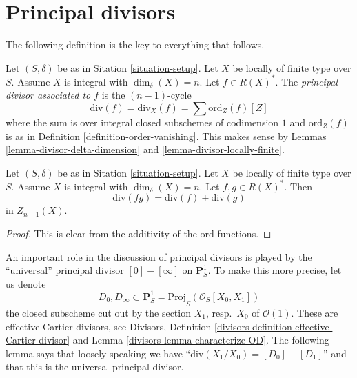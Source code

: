 \section{Principal divisors}
\label{section-principal-divisors}

\noindent
The following definition is the key to everything that follows.

\begin{definition}
\label{definition-principal-divisor}
Let $(S, \delta)$ be as in Sitation \ref{situation-setup}.
Let $X$ be locally of finite type over $S$. Assume $X$ is
integral with $\dim_\delta(X) = n$.
Let $f \in R(X)^*$. The {\it principal divisor
associated to $f$} is the $(n - 1)$-cycle
$$
\text{div}(f) = \text{div}_X(f) = \sum \text{ord}_Z(f) [Z]
$$
where the sum is over integral closed subschemes of
codimension $1$ and $\text{ord}_Z(f)$ is as in
Definition \ref{definition-order-vanishing}. This makes sense
by Lemmas \ref{lemma-divisor-delta-dimension} and
\ref{lemma-divisor-locally-finite}.
\end{definition}


\begin{lemma}
\label{lemma-div-additive}
Let $(S, \delta)$ be as in Sitation \ref{situation-setup}.
Let $X$ be locally of finite type over $S$. Assume $X$ is
integral with $\dim_\delta(X) = n$.
Let $f, g \in R(X)^*$.
Then
$$
\text{div}(fg) = \text{div}(f) + \text{div}(g)
$$
in $Z_{n - 1}(X)$.
\end{lemma}

\begin{proof}
This is clear from the additivity of the $\text{ord}$ functions.
\end{proof}

\noindent
An important role in the discussion of principal divisors
is played by the ``universal'' principal divisor $[0] - [\infty]$
on $\mathbf{P}^1_S$. To make this more precise, let us denote
$$
D_0, D_\infty \subset
\mathbf{P}^1_S = \underline{\text{Proj}}_S(\mathcal{O}_S[X_0, X_1])
$$
the closed subscheme cut out by the section $X_1$, resp.\ $X_0$
of $\mathcal{O}(1)$. These are effective Cartier divisors, see
Divisors, Definition \ref{divisors-definition-effective-Cartier-divisor}
and Lemma \ref{divisors-lemma-characterize-OD}.
The following lemma says that loosely speaking we have
``$\text{div}(X_1/X_0) = [D_0] - [D_1]$'' and that this is the
universal principal divisor.

